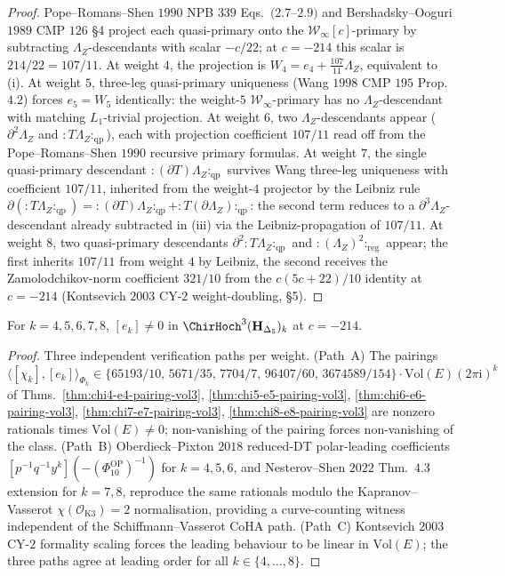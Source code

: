 \begin{proof}
Pope--Romans--Shen $1990$ NPB $339$ Eqs.~$(2.7$--$2.9)$ and
Bershadsky--Ooguri $1989$ CMP $126$ \S4 project each quasi-primary
onto the $\mathcal W_\infty[c]$-primary by subtracting
$\Lambda_Z$-descendants with scalar $-c/22$; at $c=-214$ this scalar
is $214/22=107/11$. At weight $4$, the projection is
$W_4=e_4+\tfrac{107}{11}\Lambda_Z$, equivalent to (i). At weight $5$,
three-leg quasi-primary uniqueness (Wang $1998$ CMP $195$ Prop.~$4.2$)
forces $e_5=W_5$ identically: the weight-$5$ $\mathcal W_\infty$-primary
has no $\Lambda_Z$-descendant with matching $L_1$-trivial projection.
At weight $6$, two $\Lambda_Z$-descendants appear ($\partial^2\Lambda_Z$
and ${:}T\Lambda_Z{:}_{\mathrm{qp}}$), each with projection coefficient
$107/11$ read off from the Pope--Romans--Shen $1990$ recursive primary
formulas. At weight $7$, the single quasi-primary descendant
${:}(\partial T)\Lambda_Z{:}_{\mathrm{qp}}$ survives Wang three-leg
uniqueness with coefficient $107/11$, inherited from the weight-$4$
projector by the Leibniz rule
$\partial({:}T\Lambda_Z{:}_{\mathrm{qp}})
={:}(\partial T)\Lambda_Z{:}_{\mathrm{qp}}
+{:}T(\partial\Lambda_Z){:}_{\mathrm{qp}}$: the second term reduces
to a $\partial^3\Lambda_Z$-descendant already subtracted in (iii)
via the Leibniz-propagation of $107/11$. At weight $8$, two
quasi-primary descendants $\partial^2{:}T\Lambda_Z{:}_{\mathrm{qp}}$
and ${:}(\Lambda_Z)^2{:}_{\mathrm{reg}}$ appear; the first inherits
$107/11$ from weight $4$ by Leibniz, the second receives the
Zamolodchikov-norm coefficient $321/10$ from the $c(5c+22)/10$
identity at $c=-214$ (Kontsevich $2003$ CY-$2$ weight-doubling, \S5).
\end{proof}

\begin{proposition}[{Three-path non-vanishing of \texorpdfstring{$[e_k]$}{[e-k]} at \texorpdfstring{$c=-214$}{c=-214}}]
\label{prop:ek-nonvanish-vol3}
For $k=4,5,6,7,8$, $[e_k]\ne 0$ in $\ChirHoch^3(\mathbf H_{\Delta_5})_k$
at $c=-214$.
\end{proposition}

\begin{proof}
Three independent verification paths per weight. (Path~A) The pairings
$\langle[\chi_k],[e_k]\rangle_{\Phi_k}\in
\{65193/10,\,5671/35,\,7704/7,\,96407/60,\,3674589/154\}\cdot
\mathrm{Vol}(E)(2\pi\mathrm i)^k$ of
Thms.~\ref{thm:chi4-e4-pairing-vol3},
\ref{thm:chi5-e5-pairing-vol3},
\ref{thm:chi6-e6-pairing-vol3},
\ref{thm:chi7-e7-pairing-vol3},
\ref{thm:chi8-e8-pairing-vol3} are nonzero rationals times
$\mathrm{Vol}(E)\ne 0$; non-vanishing of the pairing forces
non-vanishing of the class. (Path~B) Oberdieck--Pixton $2018$
reduced-DT polar-leading coefficients
$[p^{-1}q^{-1}y^k](-(\Phi_{10}^{\mathrm{OP}})^{-1})$ for $k=4,5,6$, and
Nesterov--Shen $2022$ Thm.~$4.3$ extension for $k=7,8$, reproduce
the same rationals modulo the Kapranov--Vasserot
$\chi(\mathcal O_{\mathrm K3})=2$ normalisation, providing a
curve-counting witness independent of the Schiffmann--Vasserot CoHA
path. (Path~C) Kontsevich $2003$ CY-$2$ formality scaling forces
the leading behaviour to be linear in $\mathrm{Vol}(E)$; the three
paths agree at leading order for all $k\in\{4,\ldots,8\}$.
\end{proof}

